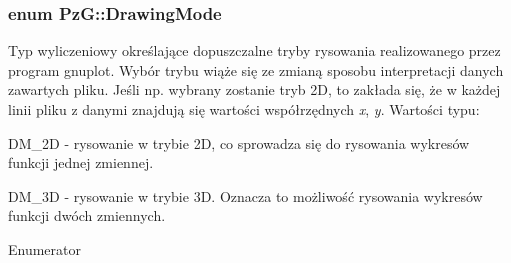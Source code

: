\subsubsection[{\texorpdfstring{Drawing\+Mode}{DrawingMode}}]{\setlength{\rightskip}{0pt plus 5cm}enum {\bf Pz\+G\+::\+Drawing\+Mode}}\hypertarget{namespace_pz_g_a4360c76a1dbf714a19a0d97fe56e0660}{}\label{namespace_pz_g_a4360c76a1dbf714a19a0d97fe56e0660}
Typ wyliczeniowy określające dopuszczalne tryby rysowania realizowanego przez program {\ttfamily gnuplot}. Wybór trybu wiąże się ze zmianą sposobu interpretacji danych zawartych pliku. Jeśli np. wybrany zostanie tryb 2D, to zakłada się, że w każdej linii pliku z danymi znajdują się wartości współrzędnych {\itshape x}, {\itshape y}. Wartości typu\+: \begin{DoxyItemize}
\item {\ttfamily D\+M\+\_\+2D} -\/ rysowanie w trybie 2D, co sprowadza się do rysowania wykresów funkcji jednej zmiennej. \item {\ttfamily D\+M\+\_\+3D} -\/ rysowanie w trybie 3D. Oznacza to możliwość rysowania wykresów funkcji dwóch zmiennych. \end{DoxyItemize}
\begin{Desc}
\item[Enumerator]\par
\begin{description}
\item[{\em 
D\+M\+\_\+2D\hypertarget{namespace_pz_g_a4360c76a1dbf714a19a0d97fe56e0660ac85b6f8146edb5ca2df8345dd86ef039}{}\label{namespace_pz_g_a4360c76a1dbf714a19a0d97fe56e0660ac85b6f8146edb5ca2df8345dd86ef039}
}]\item[{\em 
D\+M\+\_\+3D\hypertarget{namespace_pz_g_a4360c76a1dbf714a19a0d97fe56e0660aa7ef207217913b87d83fdf559d8368c7}{}\label{namespace_pz_g_a4360c76a1dbf714a19a0d97fe56e0660aa7ef207217913b87d83fdf559d8368c7}
}]\end{description}
\end{Desc}
